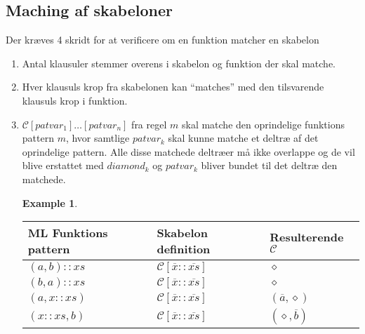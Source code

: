 \documentclass[oneside]{memoir}
\theoremstyle{definition}
\newtheorem{example}{Example}
\begin{document}

\subsection{Maching af skabeloner}


Der kræves 4 skridt for at verificere om en funktion matcher en skabelon

\begin{enumerate}
\item Antal klausuler stemmer overens i skabelon og funktion der skal matche.

\item Hver klausuls krop fra skabelonen kan ``matches'' med den tilsvarende
  klausuls krop i funktion.

\item $\mathcal{C}[patvar_1]\ldots[patvar_n]$ fra regel $m$ skal matche den
  oprindelige funktions pattern $m$, hvor samtlige $patvar_k$ skal kunne matche
  et deltræ af det oprindelige pattern. Alle disse matchede deltræer må ikke
  overlappe og de vil blive erstattet med $diamond_k$ og $patvar_k$ bliver
  bundet til det deltræ den matchede.

  
  \begin{example} \ 


    \begin{tabular}{l|l|l} 
      ML Funktions pattern & Skabelon definition & Resulterende
      $\mathcal{C}$ \\ \hline
      
      $(a,b) :: xs$ & $\mathcal{C}[\overline{x} :: \overline{xs}]$ &
      $\diamond$ \\
      
      
      $(b,a) :: xs$ & $\mathcal{C}[\overline{x} :: \overline{xs}]$ &
      $\diamond$ \\

      $(a, x::xs)$ & $\mathcal{C}[\overline{x} :: \overline{xs}]$ &
      $(\overline{a}, \diamond)$ \\

      $(x::xs, b)$ & $\mathcal{C}[\overline{x} :: \overline{xs}]$ &
      $(\diamond, \overline{b})$ \\


\end{tabular}
\end{example}
\end{enumerate}
\end{document}
